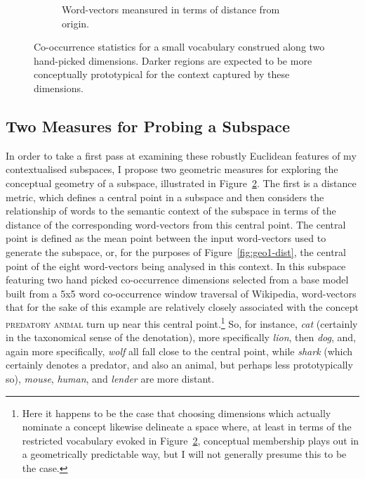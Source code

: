 \begin{figure}
\begin{subfigure}[]{0.45\textwidth}
  \caption{Word-vectors meansured in terms of distance from origin.}\label{fig:geo1-norm}
  \end{subfigure}
  \caption[Two Methods for Probing a Subspace]{Co-occurrence statistics for a small vocabulary construed along two hand-picked dimensions.  Darker regions are expected to be more conceptually prototypical for the context captured by these dimensions.}\label{fig:geo1}
\end{figure}

\subsection{Two Measures for Probing a Subspace} \label{sec:twomeasures}

In order to take a first pass at examining these robustly Euclidean features of my contextualised subspaces, I propose two geometric measures for exploring the conceptual geometry of a subspace, illustrated in Figure~\ref{fig:geo1}.  The first is a distance metric, which defines a central point in a subspace and then considers the relationship of words to the semantic context of the subspace in terms of the distance of the corresponding word-vectors from this central point.  The central point is defined as the mean point between the input word-vectors used to generate the subspace, or, for the purposes of Figure~\ref{fig:geo1-dist}, the central point of the eight word-vectors being analysed in this context.  In this subspace featuring two hand picked co-occurrence dimensions selected from a base model built from a 5x5 word co-occurrence window traversal of Wikipedia, word-vectors that for the sake of this example are relatively closely associated with the concept \textsc{predatory animal} turn up near this central point.\footnote{Here it happens to be the case that choosing dimensions which actually nominate a concept likewise delineate a space where, at least in terms of the restricted vocabulary evoked in Figure~\ref{fig:geo1}, conceptual membership plays out in a geometrically predictable way, but I will not generally presume this to be the case.}  So, for instance, \emph{cat} (certainly in the taxonomical sense of the denotation), more specifically \emph{lion}, then \emph{dog}, and, again more specifically, \emph{wolf} all fall close to the central point, while \emph{shark} (which certainly denotes a predator, and also an animal, but perhaps less prototypically so), \emph{mouse}, \emph{human}, and \emph{lender} are more distant.

